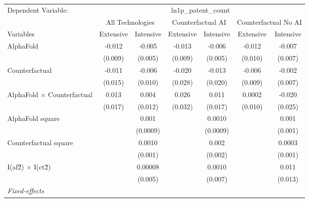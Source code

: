 \begingroup
\centering
\begin{tabular}{lcccccc}
   \tabularnewline \midrule \midrule
   Dependent Variable: & \multicolumn{6}{c}{ln1p\_patent\_count}\\
 & \multicolumn{2}{c}{All Technologies} & \multicolumn{2}{c}{Counterfactual AI} & \multicolumn{2}{c}{Counterfactual No AI} \\
\cmidrule(lr){1-1}\cmidrule(lr){2-3} \cmidrule(lr){4-5} \cmidrule(lr){6-7}
Variables & \multicolumn{1}{c}{Extensive} & \multicolumn{1}{c}{Intensive} & \multicolumn{1}{c}{Extensive} & \multicolumn{1}{c}{Intensive} & \multicolumn{1}{c}{Extensive} & \multicolumn{1}{c}{Intensive} \\
\cmidrule(lr){1-1}\cmidrule(lr){2-2} \cmidrule(lr){3-3} \cmidrule(lr){4-4} \cmidrule(lr){5-5} \cmidrule(lr){6-6} \cmidrule(lr){7-7}
   AlphaFold                          & -0.012  & -0.005   & -0.013  & -0.006   & -0.012  & -0.007\\   
                                      & (0.009) & (0.005)  & (0.009) & (0.005)  & (0.010) & (0.007)\\   
   Counterfactual                     & -0.011  & -0.006   & -0.020  & -0.013   & -0.006  & -0.002\\   
                                      & (0.015) & (0.010)  & (0.028) & (0.020)  & (0.009) & (0.007)\\   
   AlphaFold $\times$ Counterfactual  & 0.013   & 0.004    & 0.026   & 0.011    & 0.0002  & -0.020\\   
                                      & (0.017) & (0.012)  & (0.032) & (0.017)  & (0.010) & (0.025)\\   
   AlphaFold square                   &         & 0.001    &         & 0.0010   &         & 0.001\\   
                                      &         & (0.0009) &         & (0.0009) &         & (0.001)\\   
   Counterfactual square              &         & 0.0010   &         & 0.002    &         & 0.0003\\   
                                      &         & (0.001)  &         & (0.002)  &         & (0.001)\\   
   I(af\^2) $\times$ I(ct\^2)         &         & 0.00008  &         & 0.0010   &         & 0.011\\   
                                      &         & (0.005)  &         & (0.007)  &         & (0.013)\\   
   \midrule
   \emph{Fixed-effects}\\

\end{tabular}
